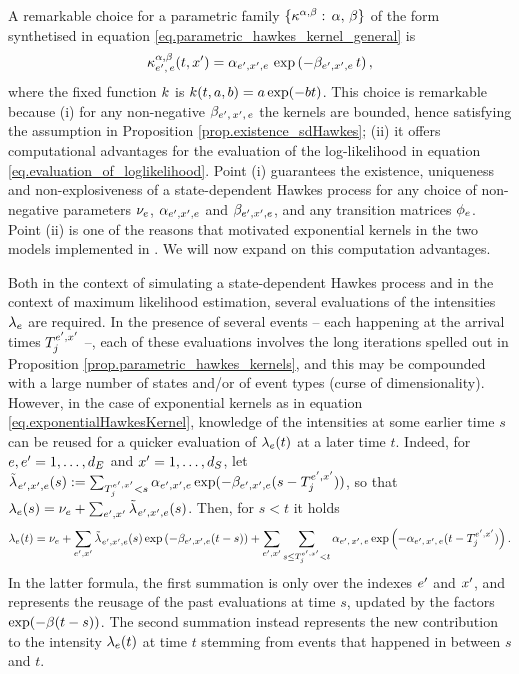 \documentclass[10pt]{article}
\begin{document}
A remarkable choice for a parametric family $\lbrace \hawkesKernel^{\impCoef,\decCoef}: \, \impCoef, \, \decCoef\rbrace$ of the form synthetised in equation \eqref{eq.parametric_hawkes_kernel_general} is 
\begin{equation}\label{eq.exponentialHawkesKernel}
 \hawkesKernel^{\alpha,\beta}\subscriptee(t,\xone) = \impCoef_{\eone,\xone,e} \, \exp\left( -\decCoef_{\eone,\xone,e} \, t \right),
\end{equation}
where the fixed function $\parametricHawkesKernel$ is $\parametricHawkesKernel(t,a,b)=a\exp(-bt)$.
This choice is remarkable because (i) for any non-negative $\decCoef\subscriptexe$ the kernels are bounded, hence satisfying the assumption in Proposition \ref{prop.existence_sdHawkes}; (ii) it offers computational advantages for the evaluation of the log-likelihood in equation \eqref{eq.evaluation_of_loglikelihood}. 
Point (i) guarantees the existence, uniqueness and non-explosiveness of a state-dependent Hawkes process for any choice of non-negative parameters $\baseRate_e$, 
$\impCoef_{\eone,\xone, e}$ and $\decCoef_{\eone,\xone, e}$, and any transition matrices $\transProb_e$. Point (ii) is one of the reasons that motivated  exponential kernels in the two models implemented in \citealp{MP18sta}. We will now expand on this computation advantages. 

Both in the context of simulating a state-dependent Hawkes process and in the context of maximum likelihood estimation, several evaluations of the intensities $\intensity$ are required. 
In the presence of several events -- each happening at the arrival times $\arrivalTimes[\eone,\xone]_j$ --, each of these evaluations involves the long iterations spelled out in Proposition \ref{prop.parametric_hawkes_kernels}, and this may be compounded with a large number of states and/or of event types (curse of dimensionality). However, in the case of exponential kernels as in equation \eqref{eq.exponentialHawkesKernel}, knowledge of the intensities at some earlier time $s$ can be reused for a quicker evaluation of $\intensity(t)$ at a later time $t$. Indeed, for $e,\eone=1,\dots,\numEventTypes$ and $\xone=1,\dots,\numStates$, let $\tilde{\intensity[]}_{\eone,\xone,e}(s):= \sum_{\arrivalTimes[\eone,\xone]_j<s}\impCoef_{\eone,\xone,e}\exp(-\decCoef_{\eone,\xone,e}(s-\arrivalTimes[\eone,\xone]_j))$, so that $\intensity[e](s)=\baseRate_e+\sum_{\eone,\xone}\tilde{\intensity[]}_{\eone,\xone,e}(s)$. Then, for $s<t$ it holds
\begin{equation}\label{eq.update_of_exponential_intensity}
 \intensity[e](t) = \baseRate_e + \sum_{\eone,\xone}\tilde{\intensity[]}_{\eone,\xone,e}(s)\exp\left(-\decCoef_{\eone,\xone,e}(t-s)\right)
 + \sum_{\eone,\xone}\sum_{s\leq\arrivalTimes[\eone,\xone]_j<t} \impCoef\subscriptexe \exp\left(-\impCoef\subscriptexe(t-\arrivalTimes[\eone,\xone]_j)\right).
\end{equation}
In the latter formula, the first summation is only over the indexes $\eone$ and $\xone$, and represents the reusage of the past evaluations at time $s$, updated by the factors $\exp(-\decCoef (t-s))$. The second summation instead represents the new contribution to the intensity $\intensity[e](t)$ at time $t$ stemming from events that happened in between $s$ and $t$. 
\end{document}

